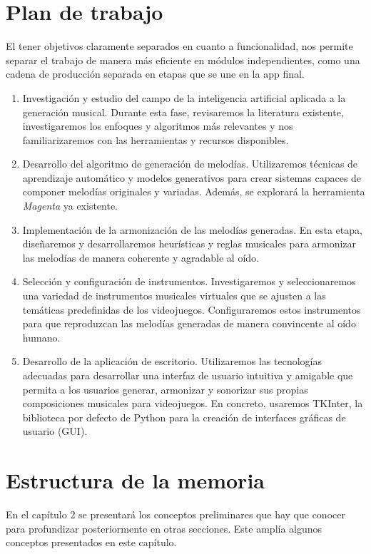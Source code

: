 \section{Plan de trabajo}
El tener objetivos claramente separados en cuanto a funcionalidad, nos permite separar el trabajo de manera más eficiente en módulos independientes, como una cadena de producción separada en etapas que se une en la app final. 

\begin{enumerate}
    \item Investigación y estudio del campo de la inteligencia artificial aplicada a la generación musical. Durante esta fase, revisaremos la literatura existente, investigaremos los enfoques y algoritmos más relevantes y nos familiarizaremos con las herramientas y recursos disponibles.
    \item Desarrollo del algoritmo de generación de melodías. Utilizaremos técnicas de aprendizaje automático y modelos generativos para crear sistemas capaces de componer melodías originales y variadas. Además, se explorará la herramienta \textit{Magenta} ya existente.
    \item Implementación de la armonización de las melodías generadas. En esta etapa, diseñaremos y desarrollaremos heurísticas y reglas musicales para armonizar las melodías de manera coherente y agradable al oído.
    \item Selección y configuración de instrumentos. Investigaremos y seleccionaremos una variedad de instrumentos musicales virtuales que se ajusten a las temáticas predefinidas de los videojuegos. Configuraremos estos instrumentos para que reproduzcan las melodías generadas de manera convincente al oído humano.
    \item Desarrollo de la aplicación de escritorio. Utilizaremos las tecnologías adecuadas para desarrollar una interfaz de usuario intuitiva y amigable que permita a los usuarios generar, armonizar y sonorizar sus propias composiciones musicales para videojuegos. En concreto, usaremos TKInter, la biblioteca por defecto de Python para la creación de interfaces gráficas de usuario (GUI).
\end{enumerate}

\section{Estructura de la memoria}

En el capítulo 2 se presentará los conceptos preliminares que hay que conocer para profundizar posteriormente en otras secciones. Este amplía algunos conceptos presentados en este capítulo.

